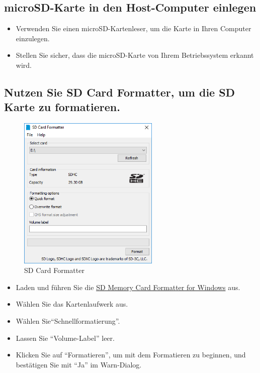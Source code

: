 \documentclass[12pt,a4paper]{report}
\begin{document}
\subsection{microSD-Karte in den Host-Computer einlegen}
\begin{itemize}
    \item Verwenden Sie einen microSD-Kartenleser, um die Karte in Ihren Computer einzulegen.
    \item Stellen Sie sicher, dass die microSD-Karte von Ihrem Betriebssystem erkannt wird.
\end{itemize}

\subsection{Nutzen Sie SD Card Formatter, um die SD Karte zu formatieren.}
\begin{figure}[h!]
    \centering
    \includegraphics[width=0.6\textwidth ]{Bilder/SD_Card_Formatter.png}
    \caption{SD Card Formatter}
\end{figure}

\begin{itemize}
    \item Laden und führen Sie die \textcolor{blue}{\href{https://www.sdcard.org/downloads/formatter/sd-memory-card-formatter-for-windows-download/}{SD Memory Card Formatter for Windows}} aus.
    \item Wählen Sie das Kartenlaufwerk aus.
    \item Wählen Sie``Schnellformatierung''.
    \item Lassen Sie ``Volume-Label'' leer.
    \item Klicken Sie auf ``Formatieren'', um mit dem Formatieren zu beginnen, und bestätigen Sie mit ``Ja'' im Warn-Dialog.
\end{itemize}
\end{document}

